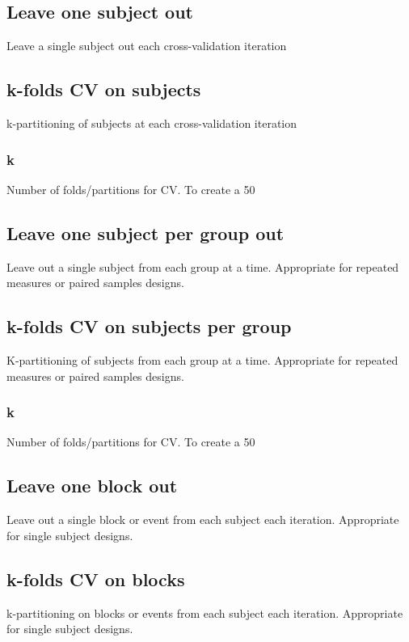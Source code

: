 \subsection{Leave one subject out}
Leave a single subject out each cross-validation iteration


\subsection{k-folds CV on subjects}
k-partitioning of subjects at each cross-validation iteration


\subsubsection{k}
Number of folds/partitions for CV. To create a 50%


\subsection{Leave one subject per group out}
Leave out a single subject from each group at a time. Appropriate for repeated measures or paired samples designs.


\subsection{k-folds CV on subjects per group}
K-partitioning of subjects from each group at a time. Appropriate for repeated measures or paired samples designs.


\subsubsection{k}
Number of folds/partitions for CV. To create a 50%


\subsection{Leave one block out}
Leave out a single block or event from each subject each iteration. Appropriate for single subject designs.


\subsection{k-folds CV on blocks}
k-partitioning on blocks or events from each subject each iteration. Appropriate for single subject designs.


